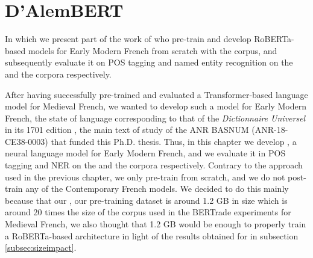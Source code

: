 \chapter{D'AlemBERT}\label{chap:dalembert}

\begin{center}
    \begin{minipage}{0.66\textwidth}
        \begin{small}
            In which we present part of the work of \citet{gabay-etal-2022-from} who pre-train and develop RoBERTa-based \citep{liu-etal-2019-roberta} models for Early Modern French from scratch with the \freemmax corpus, and subsequently evaluate it on POS tagging and named entity recognition on the \freemlpm and the \freemner corpora respectively.\footnotemark
        \end{small}
    \end{minipage}
    \vspace{0.5cm}
\end{center}


After having successfully pre-trained and evaluated a Transformer-based language model for Medieval French, we wanted to develop such a model for Early Modern French, the state of language corresponding to that of the \emph{Dictionnaire Universel} in its 1701 edition \citep{furetiere-1701-dictionnaire}, the main text of study of the ANR BASNUM (ANR-18-CE38-0003) that funded this Ph.D. thesis. Thus, in this chapter we develop \dalembert, a neural language model for Early Modern French, and we evaluate it in POS tagging and NER on the \freemlpm and the \freemner corpora respectively. Contrary to the approach used in the previous chapter, we only pre-train \dalembert from scratch, and we do not post-train any of the Contemporary French models. We decided to do this mainly because that our \freemmax, our pre-training dataset is around 1.2 GB in size which is around 20 times the size of the corpus used in the BERTrade experiments for Medieval French, we also thought that 1.2 GB would be enough to properly train a RoBERTa-based architecture in light of the results obtained for \camembert in subsection \ref{subsec:sizeimpact}.


